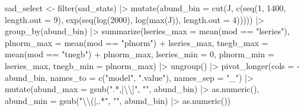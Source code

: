\documentclass[
  letterpaper,
  DIV=11,
  numbers=noendperiod]{scrartcl}
\newenvironment{Shaded}{\begin{snugshade}}{\end{snugshade}}
\newcommand{\AttributeTok}[1]{\textcolor[rgb]{0.40,0.45,0.13}{#1}}
\newcommand{\DecValTok}[1]{\textcolor[rgb]{0.68,0.00,0.00}{#1}}
\newcommand{\FunctionTok}[1]{\textcolor[rgb]{0.28,0.35,0.67}{#1}}
\newcommand{\NormalTok}[1]{\textcolor[rgb]{0.00,0.23,0.31}{#1}}
\newcommand{\OtherTok}[1]{\textcolor[rgb]{0.00,0.23,0.31}{#1}}
\newcommand{\SpecialCharTok}[1]{\textcolor[rgb]{0.37,0.37,0.37}{#1}}
\newcommand{\StringTok}[1]{\textcolor[rgb]{0.13,0.47,0.30}{#1}}
\begin{document}
\begin{Shaded}
\begin{Highlighting}[]
\NormalTok{sad\_select }\OtherTok{\textless{}{-}} \FunctionTok{filter}\NormalTok{(sad\_stats) }\SpecialCharTok{|\textgreater{}} 
    \FunctionTok{mutate}\NormalTok{(}\AttributeTok{abund\_bin =} \FunctionTok{cut}\NormalTok{(J, }\FunctionTok{c}\NormalTok{(}\FunctionTok{seq}\NormalTok{(}\DecValTok{1}\NormalTok{, }\DecValTok{1400}\NormalTok{, }\AttributeTok{length.out =} \DecValTok{9}\NormalTok{), }
                                \FunctionTok{exp}\NormalTok{(}\FunctionTok{seq}\NormalTok{(}\FunctionTok{log}\NormalTok{(}\DecValTok{2000}\NormalTok{), }\FunctionTok{log}\NormalTok{(}\FunctionTok{max}\NormalTok{(J)), }
                                        \AttributeTok{length.out =} \DecValTok{4}\NormalTok{))))) }\SpecialCharTok{|\textgreater{}} 
    \FunctionTok{group\_by}\NormalTok{(abund\_bin) }\SpecialCharTok{|\textgreater{}} 
    \FunctionTok{summarize}\NormalTok{(}\AttributeTok{lseries\_max =} \FunctionTok{mean}\NormalTok{(mod }\SpecialCharTok{==} \StringTok{"lseries"}\NormalTok{),}
              \AttributeTok{plnorm\_max =} \FunctionTok{mean}\NormalTok{(mod }\SpecialCharTok{==} \StringTok{"plnorm"}\NormalTok{) }\SpecialCharTok{+}\NormalTok{ lseries\_max, }
              \AttributeTok{tnegb\_max =} \FunctionTok{mean}\NormalTok{(mod }\SpecialCharTok{==} \StringTok{"tnegb"}\NormalTok{) }\SpecialCharTok{+}\NormalTok{ plnorm\_max, }
              \AttributeTok{lseries\_min =} \DecValTok{0}\NormalTok{, }
              \AttributeTok{plnorm\_min =}\NormalTok{ lseries\_max,}
              \AttributeTok{tnegb\_min =}\NormalTok{ plnorm\_max) }\SpecialCharTok{|\textgreater{}} 
    \FunctionTok{ungroup}\NormalTok{() }\SpecialCharTok{|\textgreater{}} 
    \FunctionTok{pivot\_longer}\NormalTok{(}\AttributeTok{cols =} \SpecialCharTok{{-}}\NormalTok{abund\_bin,}
                 \AttributeTok{names\_to =} \FunctionTok{c}\NormalTok{(}\StringTok{"model"}\NormalTok{, }\StringTok{".value"}\NormalTok{),}
                 \AttributeTok{names\_sep =} \StringTok{"\_"}\NormalTok{) }\SpecialCharTok{|\textgreater{}} 
    \FunctionTok{mutate}\NormalTok{(}\AttributeTok{abund\_max =} \FunctionTok{gsub}\NormalTok{(}\StringTok{".*,|}\SpecialCharTok{\textbackslash{}\textbackslash{}}\StringTok{]"}\NormalTok{, }\StringTok{""}\NormalTok{, abund\_bin) }\SpecialCharTok{|\textgreater{}}
               \FunctionTok{as.numeric}\NormalTok{(),}
           \AttributeTok{abund\_min =} \FunctionTok{gsub}\NormalTok{(}\StringTok{"}\SpecialCharTok{\textbackslash{}\textbackslash{}}\StringTok{(|,.*"}\NormalTok{, }\StringTok{""}\NormalTok{, abund\_bin) }\SpecialCharTok{|\textgreater{}}
               \FunctionTok{as.numeric}\NormalTok{())}


\end{Highlighting}
\end{Shaded}
\end{document}
